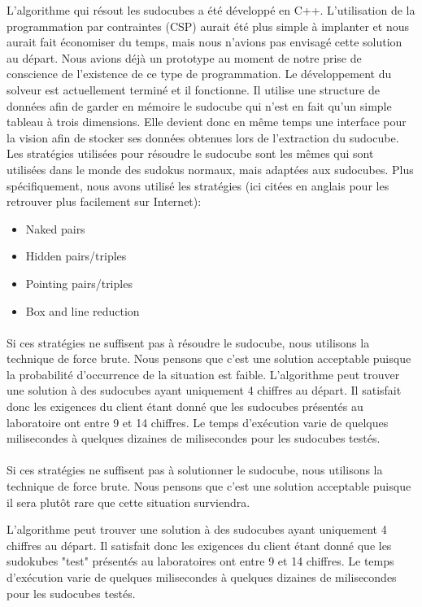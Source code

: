 L'algorithme qui résout les sudocubes a été développé en C++. L'utilisation de la programmation par contraintes (CSP) aurait été  plus simple à implanter et nous aurait fait économiser du temps, mais nous n'avions pas envisagé cette solution au départ. Nous avions déjà un prototype au moment de notre prise de conscience de l'existence de ce type de programmation. Le développement du solveur est actuellement terminé et il fonctionne.
Il utilise une structure de données afin de garder en mémoire le sudocube qui n'est en fait qu'un simple tableau à trois dimensions. Elle devient donc en même temps une interface pour la vision afin de stocker ses données obtenues lors de l'extraction du sudocube.
Les stratégies utilisées pour résoudre le sudocube sont les mêmes qui sont utilisées dans le monde des sudokus normaux, mais adaptées aux sudocubes. Plus spécifiquement, nous avons utilisé les stratégies (ici citées en anglais pour les retrouver plus facilement sur Internet):\newline
\begin{itemize}
\item Naked pairs
\item Hidden pairs/triples
\item Pointing pairs/triples
\item Box and line reduction
\end{itemize}
\paragraph{}Si ces stratégies ne suffisent pas à résoudre le sudocube, nous utilisons la technique de force brute. Nous pensons que c'est une solution acceptable puisque la probabilité d’occurrence de la situation est faible.
L'algorithme peut trouver une solution à des sudocubes ayant uniquement 4 chiffres au départ. Il satisfait donc les exigences du client étant donné que les sudocubes  présentés au laboratoire ont entre 9 et 14 chiffres. Le temps d'exécution varie de quelques milisecondes à quelques dizaines de milisecondes pour les sudocubes testés.

\paragraph{}Si ces stratégies ne suffisent pas à solutionner le sudocube, nous utilisons la technique de force brute. Nous pensons que c'est une solution acceptable puisque il sera plutôt rare que cette situation surviendra.

L'algorithme peut trouver une solution à des sudocubes ayant uniquement 4 chiffres au départ. Il satisfait donc les exigences du client étant donné que les sudokubes "test" présentés au laboratoires ont entre 9 et 14 chiffres. Le temps d'exécution varie de quelques milisecondes à quelques dizaines de milisecondes pour les sudocubes testés.

